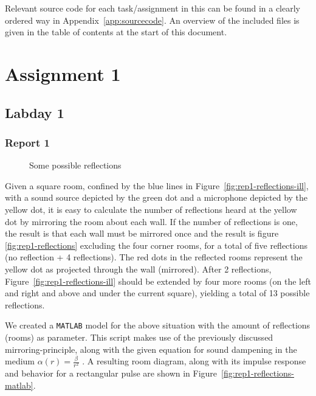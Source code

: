 \documentclass[11pt,titlepage]{report}
\begin{document}
Relevant source code for each task/assignment in this can be found in a clearly ordered way in Appendix~\ref{app:sourcecode}. An overview of the included files is given in the table of contents at the start of this document.

\chapter{Assignment 1}
\section{Labday 1}
\subsection{Report 1}

\begin{figure}[H]
	\centering
	
	\caption{Some possible reflections}
	\label{fig:reflections}
\end{figure}

Given a square room, confined by the blue lines in Figure~\ref{fig:rep1-reflections-ill}, with a sound source depicted by the green dot and a microphone depicted by the yellow dot, it is easy to calculate the number of reflections heard at the yellow dot by mirroring the room about each wall. If the number of reflections is one, the result is that each wall must be mirrored once and the result is figure \ref{fig:rep1-reflections} excluding the four corner rooms, for a total of five reflections (no reflection + 4 reflections). The red dots in the reflected rooms represent the yellow dot as projected through the wall (mirrored). After 2 reflections, Figure~\ref{fig:rep1-reflections-ill} should be extended by four more rooms (on the left and right and above and under the current square), yielding a total of 13 possible reflections.


We created a \texttt{MATLAB} model for the above situation with the amount of reflections (rooms) as parameter. This script makes use of the previously discussed mirroring-principle, along with the given equation for sound dampening in the medium $\alpha(r) = \frac{\beta}{r^2}$ \cite[91]{epo4-manual}. A resulting room diagram, along with its impulse response and behavior for a rectangular pulse are shown in Figure~\ref{fig:rep1-reflections-matlab}.
\end{document}
